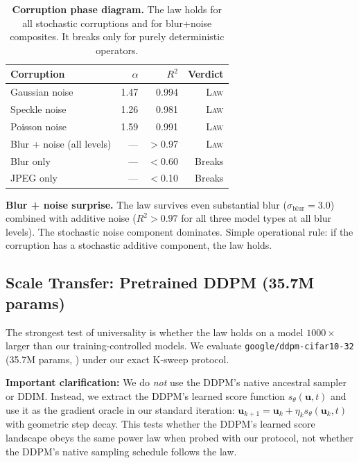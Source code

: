 \documentclass[letterpaper]{article}
\newcommand{\uu}{\mathbf{u}}
\begin{document}
\begin{table}[t]
\centering\small
\begin{tabular}{lrrr}
\toprule
Corruption & $\alpha$ & $R^2$ & Verdict \\
\midrule
Gaussian noise     & 1.47 & 0.994 & \textsc{Law} \\
Speckle noise      & 1.26 & 0.981 & \textsc{Law} \\
Poisson noise      & 1.59 & 0.991 & \textsc{Law} \\
\midrule
Blur + noise (all levels) & --- & $>$0.97 & \textsc{Law} \\
\midrule
Blur only          & --- & $<$0.60 & Breaks \\
JPEG only          & --- & $<$0.10 & Breaks \\
\bottomrule
\end{tabular}
\caption{\textbf{Corruption phase diagram.}
The law holds for all stochastic corruptions and for blur+noise
composites. It breaks only for purely deterministic operators.}
\label{tab:phase}
\end{table}

\textbf{Blur + noise surprise.}
The law survives even substantial blur ($\sigma_{\text{blur}} = 3.0$)
combined with additive noise ($R^2 > 0.97$ for all three model types
at all blur levels).
The stochastic noise component dominates.
Simple operational rule: if the corruption has a stochastic additive
component, the law holds.

\subsection{Scale Transfer: Pretrained DDPM (35.7M params)}
\label{sec:ddpm}

The strongest test of universality is whether the law holds on a
model $1000\times$ larger than our training-controlled models.
We evaluate \texttt{google/ddpm-cifar10-32} (35.7M params,
\citealt{ho2020ddpm}) under our exact K-sweep protocol.

\textbf{Important clarification:}
We do \emph{not} use the DDPM's native ancestral sampler or DDIM.
Instead, we extract the DDPM's learned score function
$s_\theta(\uu, t)$ and use it as the gradient oracle in our
standard iteration: $\uu_{k+1} = \uu_k + \eta_k s_\theta(\uu_k, t)$
with geometric step decay.
This tests whether the DDPM's learned score landscape obeys the
same power law when probed with our protocol, not whether the
DDPM's native sampling schedule follows the law.
\end{document}
